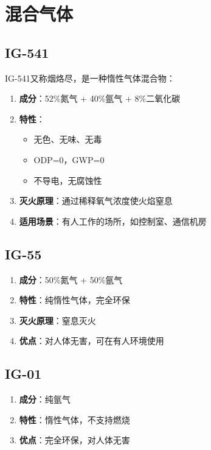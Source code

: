 \documentclass[12pt,UTF8]{ctexbook}
\begin{document}
\chapter{混合气体}

\section{IG-541}

IG-541又称烟烙尽，是一种惰性气体混合物：

\begin{enumerate}
    \item \textbf{成分}：52\%氮气 + 40\%氩气 + 8\%二氧化碳
    \item \textbf{特性}：
    \begin{itemize}[leftmargin=2em]
        \item 无色、无味、无毒
        \item ODP=0，GWP=0
        \item 不导电，无腐蚀性
    \end{itemize}
    \item \textbf{灭火原理}：通过稀释氧气浓度使火焰窒息
    \item \textbf{适用场景}：有人工作的场所，如控制室、通信机房
\end{enumerate}

\section{IG-55}

\begin{enumerate}
    \item \textbf{成分}：50\%氮气 + 50\%氩气
    \item \textbf{特性}：纯惰性气体，完全环保
    \item \textbf{灭火原理}：窒息灭火
    \item \textbf{优点}：对人体无害，可在有人环境使用
\end{enumerate}

\section{IG-01}

\begin{enumerate}
    \item \textbf{成分}：纯氩气
    \item \textbf{特性}：惰性气体，不支持燃烧
    \item \textbf{优点}：完全环保，对人体无害
\end{enumerate}
\end{document}
